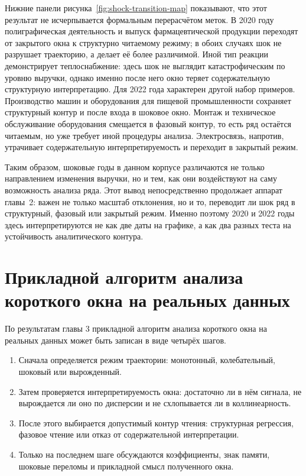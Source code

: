 Нижние панели рисунка~\ref{fig:shock-transition-map} показывают, что этот результат не исчерпывается формальным перерасчётом меток. В 2020 году полиграфическая деятельность и выпуск фармацевтической продукции переходят от закрытого окна к структурно читаемому режиму; в обоих случаях шок не разрушает траекторию, а делает её более различимой. Иной тип реакции демонстрирует теплоснабжение: здесь шок не выглядит катастрофическим по уровню выручки, однако именно после него окно теряет содержательную структурную интерпретацию. Для 2022 года характерен другой набор примеров. Производство машин и оборудования для пищевой промышленности сохраняет структурный контур и после входа в шоковое окно. Монтаж и техническое обслуживание оборудования смещается в фазовый контур, то есть ряд остаётся читаемым, но уже требует иной процедуры анализа. Электросвязь, напротив, утрачивает содержательную интерпретируемость и переходит в закрытый режим.

Таким образом, шоковые годы в данном корпусе различаются не только направлением изменения выручки, но и тем, как они воздействуют на саму возможность анализа ряда. Этот вывод непосредственно продолжает аппарат главы~2: важен не только масштаб отклонения, но и то, переводит ли шок ряд в структурный, фазовый или закрытый режим. Именно поэтому 2020 и 2022 годы здесь интерпретируются не как две даты на графике, а как два разных теста на устойчивость аналитического контура.

\section{Прикладной алгоритм анализа короткого окна на реальных данных}
\label{sec:prikladnoi-algoritm-analiza-korotkogo-okna-na-realnyh-dannyh}

По результатам главы 3 прикладной алгоритм анализа короткого окна на реальных данных может быть записан в виде четырёх шагов.

\begin{enumerate}
\def\labelenumi{\arabic{enumi}.}
\tightlist
\item
  Сначала определяется режим траектории: монотонный, колебательный, шоковый или вырожденный.
\item
  Затем проверяется интерпретируемость окна: достаточно ли в нём сигнала, не вырождается ли оно по дисперсии и не схлопывается ли в коллинеарность.
\item
  После этого выбирается допустимый контур чтения: структурная регрессия, фазовое чтение или отказ от содержательной интерпретации.
\item
  Только на последнем шаге обсуждаются коэффициенты, знак памяти, шоковые переломы и прикладной смысл полученного окна.
\end{enumerate}

